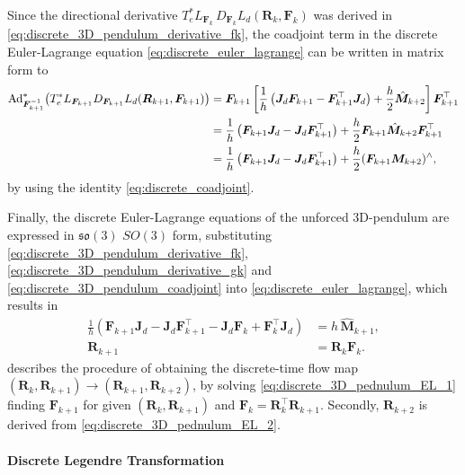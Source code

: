 Since the directional derivative
$T_e^*L_{\bm{F}_k}\,D_{\bm{F}_k}L_d(\bm{R}_k,\bm{F}_k)$
was derived in \eqref{eq:discrete_3D_pendulum_derivative_fk}, the coadjoint term in the discrete Euler-Lagrange equation \eqref{eq:discrete_euler_lagrange} can be written in matrix form to 
{\small
\begin{align}
\operatorname{Ad}^{*}_{\bm{F}_{k+1}^{-1}}
\!\left(
T_e^*L_{\bm{F}_{k+1}}
D_{\bm{F}_{k+1}}L_d(\bm{R}_{k+1},\bm{F}_{k+1})
\right)
&=
\bm{F}_{k+1}
\left[
\frac{1}{h}
\left(
\bm{J}_d\bm{F}_{k+1}
-
\bm{F}_{k+1}^{\top}\bm{J}_d
\right)
+
\frac{h}{2}\hat{\bm{M}}_{k+2}
\right]
\bm{F}_{k+1}^{\top}
\notag\\
&=
\frac{1}{h}
\left(
\bm{F}_{k+1}\bm{J}_d
-
\bm{J}_d\bm{F}_{k+1}^{\top}
\right)
+
\frac{h}{2}\bm{F}_{k+1}\hat{\bm{M}}_{k+2}\bm{F}_{k+1}^{\top}
\notag\\
&=
\frac{1}{h}
\left(
\bm{F}_{k+1}\bm{J}_d
-
\bm{J}_d\bm{F}_{k+1}^{\top}
\right)
+
\frac{h}{2}(\bm{F}_{k+1}\bm{M}_{k+2})^\wedge\label{eq:discrete_3D_pendulum_coadjoint},
\end{align}}
by using the identity \eqref{eq:discrete_coadjoint}.

Finally, the discrete Euler-Lagrange equations of the unforced 3D-pendulum are expressed in $\mathfrak{so}(3)$ $SO(3)$ form, substituting \eqref{eq:discrete_3D_pendulum_derivative_fk}, \eqref{eq:discrete_3D_pendulum_derivative_gk} and \eqref{eq:discrete_3D_pendulum_coadjoint} into \eqref{eq:discrete_euler_lagrange}, which results in
\begin{subequations}\label{eq:discrete_3D_pendulum_EL}
\begin{align}
    \label{eq:discrete_3D_pednulum_EL_1}
    \frac{1}{h}\left(
        \bm{F}_{k+1}\bm{J}_d
        - \bm{J}_d\bm{F}_{k+1}^{\top}
        - \bm{J}_d\bm{F}_k
        + \bm{F}_k^{\top}\bm{J}_d
    \right)
    &=
    h\,\hat{\bm{M}}_{k+1}, \\
    \label{eq:discrete_3D_pednulum_EL_2}
    \bm{R}_{k+1} &= \bm{R}_k \bm{F}_k.
\end{align}
\end{subequations}
\cite{Lee2008} describes the procedure of obtaining the discrete-time flow map $(\bm{R}_{k},\bm{R}_{k+1}) \to (\bm{R}_{k+1},\bm{R}_{k+2})$, by solving \eqref{eq:discrete_3D_pednulum_EL_1} finding $\bm{F}_{k+1}$ for given $(\bm{R}_{k},\bm{R}_{k+1})$ and $\bm{F}_k = \bm{R}_k^\top\bm{R}_{k+1}$. Secondly, $\bm{R}_{k+2}$ is derived from \eqref{eq:discrete_3D_pednulum_EL_2}.  

\paragraph{Discrete Legendre Transformation}

